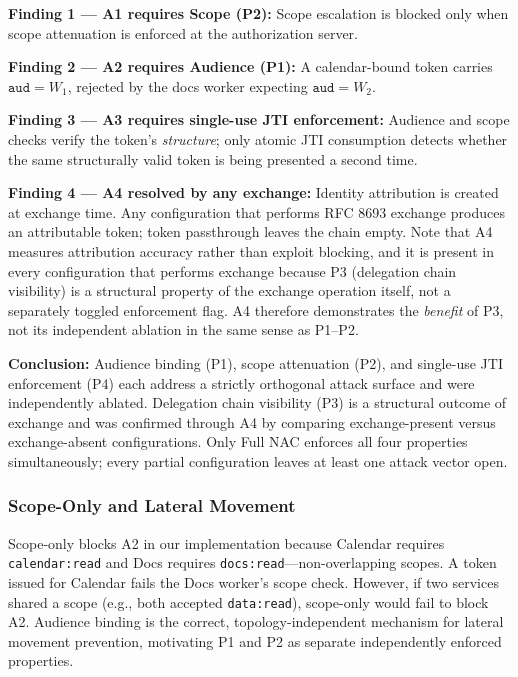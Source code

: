 \documentclass[journal]{IEEEtran}
\theoremstyle{definition}
\begin{document}
\textbf{Finding 1 — A1 requires Scope (P2):} Scope escalation is blocked only
when scope attenuation is enforced at the authorization server.

\textbf{Finding 2 — A2 requires Audience (P1):} A calendar-bound token carries
$\texttt{aud}=W_1$, rejected by the docs worker expecting $\texttt{aud}=W_2$.

\textbf{Finding 3 — A3 requires single-use JTI enforcement:} Audience and scope
checks verify the token's \textit{structure}; only atomic JTI consumption
detects whether the same structurally valid token is being presented a second
time.

\textbf{Finding 4 — A4 resolved by any exchange:} Identity attribution is
created at exchange time. Any configuration that performs RFC 8693 exchange
produces an attributable token; token passthrough leaves the chain empty.
Note that A4 measures attribution accuracy rather than exploit blocking, and it
is present in every configuration that performs exchange because P3 (delegation
chain visibility) is a structural property of the exchange operation itself,
not a separately toggled enforcement flag. A4 therefore demonstrates the
\textit{benefit} of P3, not its independent ablation in the same sense as
P1--P2.

\textbf{Conclusion:} Audience binding (P1), scope attenuation (P2), and
single-use JTI enforcement (P4) each address a strictly orthogonal attack
surface and were independently ablated. Delegation chain visibility (P3) is a structural outcome
of exchange and was confirmed through A4 by comparing exchange-present versus
exchange-absent configurations. Only Full NAC enforces all four properties
simultaneously; every partial configuration leaves at least one attack vector
open.

\subsubsection{Scope-Only and Lateral Movement}
\label{sec:scope_caveat}
Scope-only blocks A2 in our implementation because Calendar requires
\texttt{calendar:read} and Docs requires \texttt{docs:read}---non-overlapping
scopes. A token issued for Calendar fails the Docs worker's scope check.
However, if two services shared a scope (e.g., both accepted \texttt{data:read}),
scope-only would fail to block A2. Audience binding is the correct,
topology-independent mechanism for lateral movement prevention, motivating P1
and P2 as separate independently enforced properties.
\end{document}
